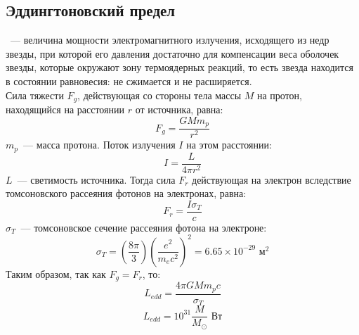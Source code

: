\subsection{Эддингтоновский предел}
~--- величина мощности электромагнитного излучения, исходящего из недр звезды, при которой его давления достаточно для компенсации веса оболочек звезды, которые окружают зону термоядерных реакций, то есть звезда находится в состоянии равновесия: не сжимается и не расширяется.\\
Сила тяжести $F_g$, действующая со стороны тела массы $M$ на протон, находящийся на расстоянии $r$ от источника, равна:
\begin{equation}
F_g = \frac{G M m_p}{r^2}
\end{equation}
$m_p$~--- масса протона.
Поток излучения $I$ на этом расстоянии:
\begin{equation}
I=\frac{L}{4\pi r^2}
\end{equation}
$L$~--- светимость источника.
Тогда сила $F_r$ действующая на электрон вследствие томсоновского рассеяния фотонов на электронах, равна:
\begin{equation}
F_r = \frac{I \sigma_T}{c}
\end{equation}
$\sigma_T$~--- томсоновское сечение рассеяния фотона на электроне:
\begin{equation}
\sigma_T = \left(\frac{8\pi}{3}\right)\left(\frac{e^2}{m_e c^2}\right)^2 = 6.65 \times 10^{-29} \text{ м}^2
\end{equation}
Таким образом, так как $F_g=F_r$, то:
\begin{equation}
L_{edd} = \frac{4\pi G M m_p c}{\sigma_T}
\end{equation}
\begin{equation}
L_{edd} = 10^{31} \frac{M}{M_\odot} \text{ Вт}
\end{equation}